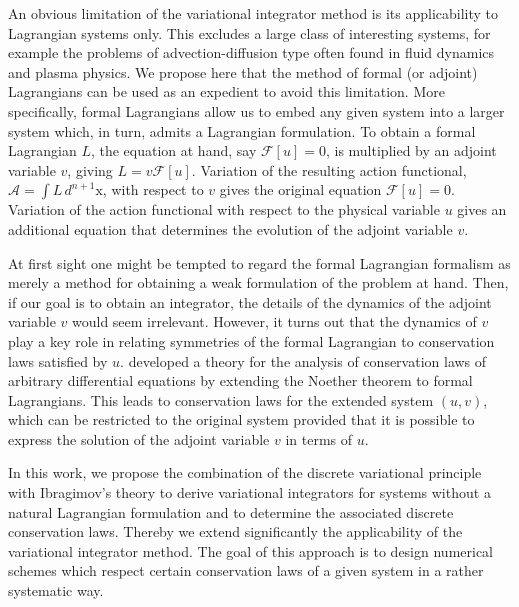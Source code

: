 \documentclass[12pt,a4paper,reqno]{article}
\begin{document}
An obvious limitation of the variational integrator method is its applicability to Lagrangian systems only.
This excludes a large class of interesting systems, for example the problems of advection-diffusion type often found in fluid dynamics and plasma physics.
We propose here that the method of formal (or adjoint) Lagrangians \cite{AthertonHomsy:1975} can be used as an expedient to avoid this limitation.
More specifically, formal Lagrangians allow us to embed any given system into a larger system which, in turn, admits a Lagrangian formulation.
To obtain a formal Lagrangian $L$, the equation at hand, say $\mathcal{F} [{\ensuremath{{\ensuremath{{u}}}}}] = 0$, is multiplied by an adjoint variable ${\ensuremath{{\ensuremath{{v}}}}}$, giving $L = {\ensuremath{{\ensuremath{{v}}}}} \mathcal{F} [{\ensuremath{{\ensuremath{{u}}}}}]$.
Variation of the resulting action functional, $\mathcal{A} = \int L \, d^{n+1} {\ensuremath{{\ensuremath{\mathrm{{x}}}}}}$, with respect to ${\ensuremath{{\ensuremath{{v}}}}}$ gives the original equation $\mathcal{F} [{\ensuremath{{\ensuremath{{u}}}}}] = 0$.
Variation of the action functional with respect to the physical variable ${\ensuremath{{\ensuremath{{u}}}}}$ gives an additional equation that determines the evolution of the adjoint variable ${\ensuremath{{\ensuremath{{v}}}}}$.

At first sight one might be tempted to regard the formal Lagrangian formalism as merely a method for obtaining a weak formulation of the problem at hand. 
Then, if our goal is to obtain an integrator, the details of the dynamics of the adjoint variable ${\ensuremath{{\ensuremath{{v}}}}}$ would seem irrelevant.
However, it turns out that the dynamics of ${\ensuremath{{\ensuremath{{v}}}}}$ play a key role in relating symmetries of the formal Lagrangian to conservation laws satisfied by ${\ensuremath{{\ensuremath{{u}}}}}$.
\citeauthor{Ibragimov:2006} \cite{Ibragimov:2006, Ibragimov:2007a, Ibragimov:2007b} developed a theory for the analysis of conservation laws of arbitrary differential equations by extending the Noether theorem to formal Lagrangians. This leads to conservation laws for the extended system $({\ensuremath{{\ensuremath{{u}}}}}, {\ensuremath{{\ensuremath{{v}}}}})$, which can be restricted to the original system provided that it is possible to express the solution of the adjoint variable ${\ensuremath{{\ensuremath{{v}}}}}$ in terms of ${\ensuremath{{\ensuremath{{u}}}}}$.

In this work, we propose the combination of the discrete variational principle with Ibragimov's theory to derive variational integrators for systems without a natural Lagrangian formulation and to determine the associated discrete conservation laws.
Thereby we extend significantly the applicability of the variational integrator method.
The goal of this approach is to design numerical schemes which respect certain conservation laws of a given system in a rather systematic way.
\end{document}
